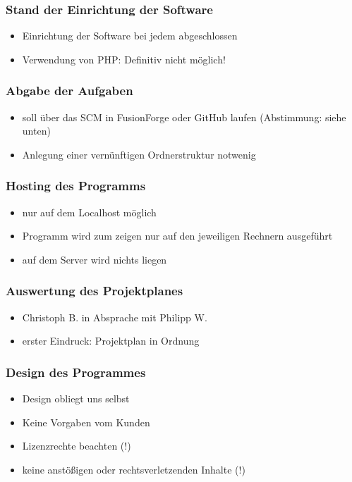 \documentclass[12pt,a4paper]{article}
\begin{document}
\subsubsection*{Stand der Einrichtung der Software}
\begin{itemize}
\item Einrichtung der Software bei jedem abgeschlossen
\item Verwendung von PHP: Definitiv nicht möglich!
\end{itemize}

\subsubsection*{Abgabe der Aufgaben}
\begin{itemize}
\item soll über das SCM in FusionForge oder GitHub laufen (Abstimmung: siehe unten)
\item Anlegung einer vernünftigen Ordnerstruktur notwenig
\end{itemize}

\subsubsection*{Hosting des Programms}
\begin{itemize}
\item nur auf dem Localhost möglich
\item Programm wird zum zeigen nur auf den jeweiligen Rechnern ausgeführt
\item auf dem Server wird nichts liegen
\end{itemize}

\subsubsection*{Auswertung des Projektplanes}
\begin{itemize}
\item Christoph B. in Absprache mit Philipp W.
\item erster Eindruck: Projektplan in Ordnung
\end{itemize}

\subsubsection*{Design des Programmes}
\begin{itemize}
\item Design obliegt uns selbst
\item Keine Vorgaben vom Kunden
\item  Lizenzrechte beachten (!)
\item keine anstößigen oder rechtsverletzenden Inhalte (!)
\end{itemize}
\end{document}
